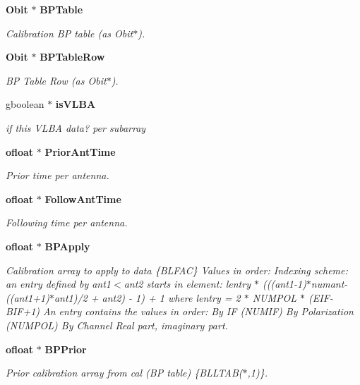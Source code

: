 \begin{CompactItemize}
{\bf Obit} $\ast$ {\bf BPTable}
\begin{CompactList}\small\item\em Calibration BP table (as Obit$\ast$). \item\end{CompactList}\item 
{\bf Obit} $\ast$ {\bf BPTable\-Row}
\begin{CompactList}\small\item\em BP Table Row (as Obit$\ast$). \item\end{CompactList}\item 
gboolean $\ast$ {\bf is\-VLBA}
\begin{CompactList}\small\item\em if this VLBA data? per subarray \item\end{CompactList}\item 
{\bf ofloat} $\ast$ {\bf Prior\-Ant\-Time}
\begin{CompactList}\small\item\em Prior time per antenna. \item\end{CompactList}\item 
{\bf ofloat} $\ast$ {\bf Follow\-Ant\-Time}
\begin{CompactList}\small\item\em Following time per antenna. \item\end{CompactList}\item 
{\bf ofloat} $\ast$ {\bf BPApply}
\begin{CompactList}\small\item\em Calibration array to apply to data \{BLFAC\} Values in order: Indexing scheme: an entry defined by ant1$<$ant2 starts in element: lentry $\ast$ (((ant1-1)$\ast$numant-((ant1+1)$\ast$ant1)/2 + ant2) - 1) + 1 where lentry = 2 $\ast$ NUMPOL $\ast$ (EIF-BIF+1) An entry contains the values in order: By IF (NUMIF) By Polarization (NUMPOL) By Channel Real part, imaginary part. \item\end{CompactList}\item 
{\bf ofloat} $\ast$ {\bf BPPrior}
\begin{CompactList}\small\item\em Prior calibration array from cal (BP table) \{BLLTAB($\ast$,1)\}. \item\end{CompactList}\item 

\end{CompactItemize}
